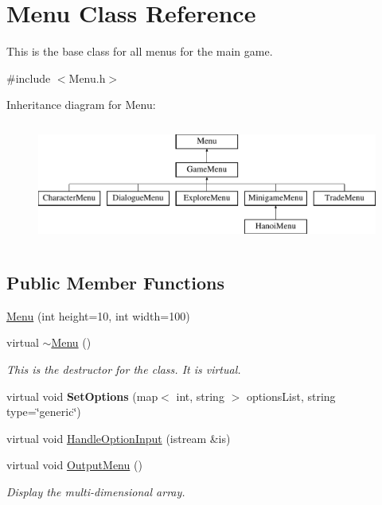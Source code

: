 \hypertarget{classMenu}{\section{Menu Class Reference}
\label{classMenu}
}


This is the base class for all menus for the main game.  




{\ttfamily \#include $<$Menu.\-h$>$}

Inheritance diagram for Menu\-:\begin{figure}[H]
\begin{center}
\leavevmode
\includegraphics[height=4.000000cm]{classMenu}
\end{center}
\end{figure}
\subsection*{Public Member Functions}
\begin{DoxyCompactItemize}
\item 
\hyperlink{classMenu_a5a60e837b160444bee4525c06fd4c51e}{Menu} (int height=10, int width=100)
\item 
\hypertarget{classMenu_a831387f51358cfb88cd018e1777bc980}{virtual \hyperlink{classMenu_a831387f51358cfb88cd018e1777bc980}{$\sim$\-Menu} ()}\label{classMenu_a831387f51358cfb88cd018e1777bc980}

\begin{DoxyCompactList}\small\item\em This is the destructor for the class. It is virtual. \end{DoxyCompactList}\item 
\hypertarget{classMenu_a89c9ed81c1bc8bf68cec3b0c9ab877a1}{virtual void {\bfseries Set\-Options} (map$<$ int, string $>$ options\-List, string type=\char`\"{}generic\char`\"{})}\label{classMenu_a89c9ed81c1bc8bf68cec3b0c9ab877a1}

\item 
virtual void \hyperlink{classMenu_a81bb84f921911944e4060d1c5a1b2507}{Handle\-Option\-Input} (istream \&is)
\item 
\hypertarget{classMenu_a4665a914fe24a8b11d8d6c95792184b3}{virtual void \hyperlink{classMenu_a4665a914fe24a8b11d8d6c95792184b3}{Output\-Menu} ()}\label{classMenu_a4665a914fe24a8b11d8d6c95792184b3}

\begin{DoxyCompactList}\small\item\em Display the multi-\/dimensional array. \end{DoxyCompactList}\end{DoxyCompactItemize}
